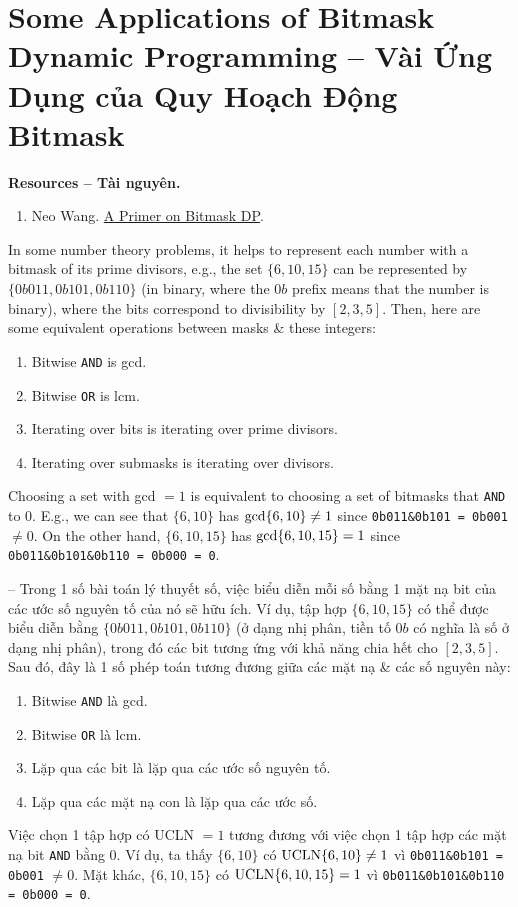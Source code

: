 \documentclass{article}
\begin{document}

\section{Some Applications of Bitmask Dynamic Programming -- Vài Ứng Dụng của Quy Hoạch Động Bitmask}
\textbf{\textsf{Resources -- Tài nguyên.}}
\begin{enumerate}
    \item {\sc Neo Wang}. \href{https://nwatx.me/post/dpbitmasks}{A Primer on Bitmask DP}.
\end{enumerate}
In some number theory problems, it helps to represent each number with a bitmask of its prime divisors, e.g., the set $\{6,10,15\}$ can be represented by $\{0b011,0b101,0b110\}$ (in binary, where the $0b$ prefix means that the number is binary), where the bits correspond to divisibility by $[2,3,5]$. Then, here are some equivalent operations between masks \& these integers:
\begin{enumerate}
    \item Bitwise {\tt AND} is gcd.
    \item Bitwise {\tt OR} is lcm.
    \item Iterating over bits is iterating over prime divisors.
    \item Iterating over submasks is iterating over divisors.
\end{enumerate}
Choosing a set with gcd $= 1$ is equivalent to choosing a set of bitmasks that {\tt AND} to 0. E.g., we can see that $\{6,10\}$ has ${\rm gcd}\{6,10\}\ne1$ since \verb|0b011&0b101 = 0b001| $\ne 0$. On the other hand, $\{6,10,15\}$ has ${\rm gcd}\{6,10,15\} = 1$ since \verb|0b011&0b101&0b110 = 0b000 = 0|.

-- Trong 1 số bài toán lý thuyết số, việc biểu diễn mỗi số bằng 1 mặt nạ bit của các ước số nguyên tố của nó sẽ hữu ích. Ví dụ, tập hợp $\{6,10,15\}$ có thể được biểu diễn bằng $\{0b011,0b101,0b110\}$ (ở dạng nhị phân, tiền tố $0b$ có nghĩa là số ở dạng nhị phân), trong đó các bit tương ứng với khả năng chia hết cho $[2,3,5]$. Sau đó, đây là 1 số phép toán tương đương giữa các mặt nạ \& các số nguyên này:

\begin{enumerate}
    \item Bitwise {\tt AND} là gcd.
    \item Bitwise {\tt OR} là lcm.
    \item Lặp qua các bit là lặp qua các ước số nguyên tố.
    \item Lặp qua các mặt nạ con là lặp qua các ước số.
\end{enumerate}
Việc chọn 1 tập hợp có UCLN $= 1$ tương đương với việc chọn 1 tập hợp các mặt nạ bit {\tt AND} bằng 0. Ví dụ, ta thấy $\{6,10\}$ có ${\rm UCLN}\{6,10\}\ne1$ vì \verb|0b011&0b101 = 0b001| $\ne 0$. Mặt khác, $\{6,10,15\}$ có ${\rm UCLN}\{6,10,15\} = 1$ vì \verb|0b011&0b101&0b110 = 0b000 = 0|.
\end{document}
